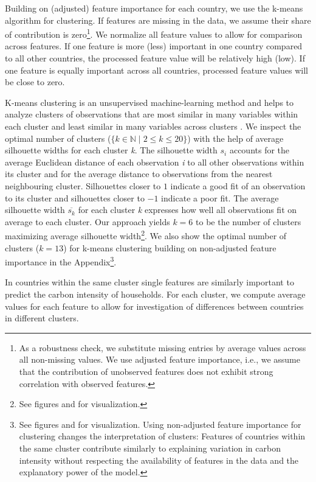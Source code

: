 \documentclass[12pt, a4paper]{article}
\begin{document}
Building on (adjusted) feature importance for each country, we use the k-means algorithm for clustering. If features are missing in the data, we assume their share of contribution is zero\footnote{As a robustness check, we substitute missing entries by average values across all non-missing values. We use adjusted feature importance, i.e., we assume that the contribution of unobserved features does not exhibit strong correlation with observed features.}. We normalize all feature values to allow for comparison across features. If one feature is more (less) important in one country compared to all other countries, the processed feature value will be relatively high (low). If one feature is equally important across all countries, processed feature values will be close to zero.

K-means clustering is an unsupervised machine-learning method and helps to analyze clusters of observations that are most similar in many variables within each cluster and least similar in many variables across clusters \autocite{MacQueen.1967}. We inspect the optimal number of clusters ($\{k \in \mathbb{N} \mid 2  \leq k \leq 20 \}$) with the help of average silhouette widths \autocite{Rousseeuw.1987} for each cluster \textit{k}. The silhouette width $s_{i}$ accounts for the average Euclidean distance of each observation \textit{i} to all other observations within its cluster and for the average distance to observations from the nearest neighbouring cluster. Silhouettes closer to $1$ indicate a good fit of an observation to its cluster and silhouettes closer to $-1$ indicate a poor fit. The average silhouette width $\overline{s_{k}}$ for each cluster \textit{k} expresses how well all observations fit on average to each cluster. Our approach yields $k = 6$ to be the number of clusters maximizing average silhouette width\footnote{See figures  and  for visualization.}. We also show the optimal number of clusters ($k = 13$) for k-means clustering building on non-adjusted feature importance in the Appendix\footnote{See figures  and  for visualization. Using non-adjusted feature importance for clustering changes the interpretation of clusters: Features of countries within the same cluster contribute similarly to explaining variation in carbon intensity without respecting the availability of features in the data and the explanatory power of the model.}.

In countries within the same cluster single features are similarly important to predict the carbon intensity of households. For each cluster, we compute average values for each feature to allow for investigation of differences between countries in different clusters.%
\end{document}
